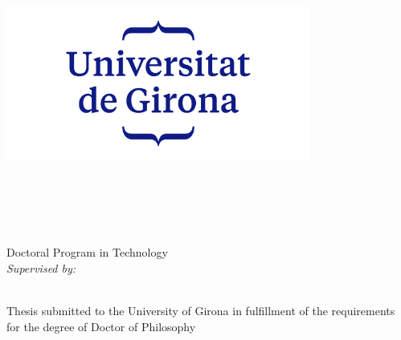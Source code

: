 \begin{titlepage}
    \begin{center}
        \large  

		\hfill
		\vfill
		
		\includegraphics[width=10cm]{0_frontmatter/figures/udg_logo} \\ \medskip
	
        \hfill


		\myDegree \\ \bigskip
		
        \begingroup
            \color{Maroon}\spacedallcaps{\myTitle} \\ \bigskip
        \endgroup

        \spacedlowsmallcaps{\myName}

        \vfill

        \myTime \\ \medskip
        Doctoral Program in Technology\\ \bigskip
        \textit{Supervised by:}\\
        
        \mySupervisor \\ \bigskip
        
        Thesis submitted to the University of Girona in fulfillment of the
        requirements for the degree of Doctor of Philosophy


        \vfill                      

    \end{center}  
\end{titlepage}   